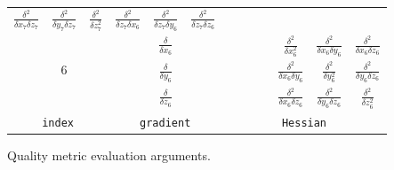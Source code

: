 \documentclass{article}
\begin{document}
\begin{figure}[htb]
\begin{center}
\begin{tabular}{c|c|cc|c|cc|ccc|ccc|}
$\frac{\delta^2}{\delta x_7 \delta z_7}$ &
$\frac{\delta^2}{\delta y_7 \delta z_7}$ &
$\frac{\delta^2}{\delta z_7^2}         $ &

$\frac{\delta^2}{\delta z_7 \delta x_6}$ &
$\frac{\delta^2}{\delta z_7 \delta y_6}$ &
$\frac{\delta^2}{\delta z_7 \delta z_6}$ \\

\cline{2-2}
\cline{5-5}
\cline{8-13}

\hspace{0.2cm} & & \hspace{0.2cm} & \hspace{0.2cm} &

$\frac{\delta}{\delta x_6}$ & \hspace{0.2cm} & \hspace{0.2cm} &

& & &

$\frac{\delta^2}{\delta x_6^2}         $ &
$\frac{\delta^2}{\delta x_6 \delta y_6}$ &
$\frac{\delta^2}{\delta x_6 \delta z_6}$ \\


\hspace{0.2cm} & $6$ & \hspace{0.2cm} & \hspace{0.2cm} &

$\frac{\delta}{\delta y_6}$ & \hspace{0.2cm} & \hspace{0.2cm} &

& & &

$\frac{\delta^2}{\delta x_6 \delta y_6}$ &
$\frac{\delta^2}{\delta y_6^2}         $ &
$\frac{\delta^2}{\delta y_6 \delta z_6}$ \\

\hspace{0.2cm} & & \hspace{0.2cm} & \hspace{0.2cm} &

$\frac{\delta}{\delta z_6}$ & \hspace{0.2cm} & \hspace{0.2cm} &

& & &

$\frac{\delta^2}{\delta x_6 \delta z_6}$ &
$\frac{\delta^2}{\delta y_6 \delta z_6}$ &
$\frac{\delta^2}{\delta z_6^2}         $  \\

\cline{2-2}
\cline{5-5}
\cline{8-13}

\multicolumn{3}{c}{\texttt{index}} &  \multicolumn{3}{c}{\texttt{gradient}} &  \multicolumn{7}{c}{\texttt{Hessian}} \\

\end{tabular}
\end{center}

\caption{Quality metric evaluation arguments.\label{fig:evalargs}}
\end{figure}
\end{document}
